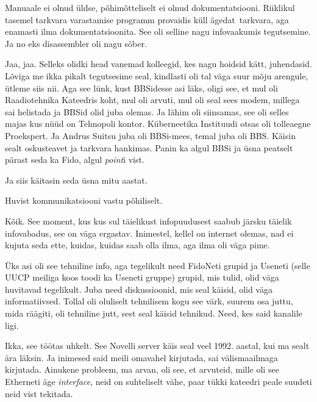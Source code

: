 Manuaale ei olnud üldse, põhimõtteliselt ei olnud dokumentatsiooni. Riiklikul 
tasemel tarkvara varastamise programm provaidis küll ägedat tarkvara, aga 
enamasti ilma dokumentatsioonita. See oli selline nagu  infovaakumis 
tegutsemine. Ja no eks disassembler oli nagu sõber.


Jaa, jaa. Selleks olidki head vanemad kolleegid, kes nagu hoidsid kätt, 
juhendasid. Lõviga me ikka pikalt tegutsesime seal, kindlasti 
oli tal väga suur mõju arengule, ütleme siis nii. Aga see lünk,  kust BBSidesse 
asi läks,  oligi see, et mul oli Raadiotehnika Kateedris koht, mul oli 
arvuti, mul oli seal sees modem, millega sai helistada ja BBSid olid juba 
olemas. Ja lähim oli siinsamas, see oli selles majas kus nüüd on 
Tehnopoli kontor. Küberneetika Instituudi otsas oli tolleaegne 
Proekspert. Ja Andrus Suitsu juba 
oli BBSi-mees, temal juba oli BBS. Käisin sealt oskusteavet ja tarkvara 
hankimas. Panin ka algul BBSi ja üsna peatselt pärast seda ka Fido, algul 
\emph{point}i vist.

Ja siis käitasin seda üsna mitu aastat. 


Huvist kommunikatsiooni vastu põhiliselt.


Kõik. See moment, kus kus sul täielikust infopuudusest saabub järsku täielik 
infovabadus, see on väga ergastav. Inimestel, kellel on internet olemas, nad ei 
kujuta seda ette, kuidas, kuidas saab olla ilma, aga ilma oli väga pime.

Üks asi oli see tehniline info, aga tegelikult need FidoNeti grupid ja Useneti 
(selle UUCP meiliga koos toodi ka Useneti gruppe) grupid, mis tulid, olid väga 
huvitavad tegelikult. Juba need diskussioonid, mis seal käisid, olid väga 
informatiivsed. Tollal oli oluliselt tehnilisem kogu see värk, suurem osa 
juttu, mida räägiti, oli tehniline jutt, sest seal käisid tehnikud. Need, kes 
said kanalile ligi.


Ikka, see töötas uhkelt. See Novelli server käis seal veel 1992. aastal, kui ma 
sealt ära läksin. Ja inimesed said meili omavahel kirjutada, sai välismaailmaga 
kirjutada. Ainukene probleem, ma arvan, oli see, et arvuteid, mille oli see 
Etherneti äge \emph{interface}, neid on suhteliselt vähe, paar tükki kateedri 
peale suudeti neid vist tekitada.

